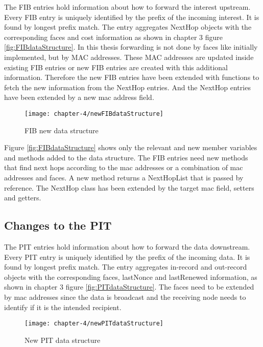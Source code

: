 The FIB entries hold information about how to forward the interest upstream. Every FIB entry is uniquely identified by the prefix of the incoming interest. It is found by longest prefix match. The entry aggregates NextHop objects with the corresponding faces and cost information as shown in chapter 3 figure \ref{fig:FIBdataStructure}.
In this thesis forwarding is not done by faces like initially implemented, but by MAC addresses. These MAC addresses are updated inside existing FIB entries or new FIB entries are created with this additional information. Therefore the new FIB entries have been extended with functions to fetch the new information from the NextHop entries. And the NextHop entries have been extended by a new mac address field.

\begin{figure}[H]
  \centering
  \texttt{[image: chapter-4/newFIBdataStructure]}
  \caption{FIB new data structure}
  \label{fig:newFIBdataStructure}
\end{figure}

Figure \ref{fig:FIBdataStructure} shows only the relevant and new member variables and methods added to the data structure. The FIB entries need new methods that find next hops according to the mac addresses or a combination of mac addresses and faces. A new method returns a NextHopList that is passed by reference. The NextHop class has been extended by the target mac field, setters and getters.

\subsection{Changes to the PIT}

The PIT entries hold information about how to forward the data downstream. Every PIT entry is uniquely identified by the prefix of the incoming data. It is found by longest prefix match. The entry aggregates in-record and out-record objects with the corresponding faces, lastNonce and lastRenewed information, as shown in chapter 3 figure \ref{fig:PITdataStructure}. The faces need to be extended by mac addresses since the data is broadcast and the receiving node needs to identify if it is the intended recipient.

\begin{figure}[H]
  \centering
  \texttt{[image: chapter-4/newPITdataStructure]}
  \caption{New PIT data structure}
  \label{fig:newPITdataStructure}
\end{figure}

